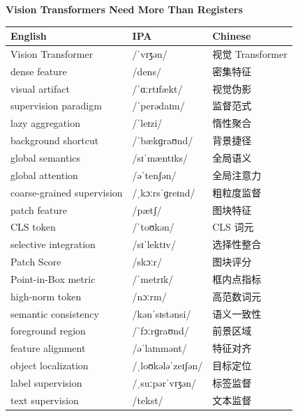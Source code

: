 \documentclass[UTF8,12pt,a4paper]{ctexart}
\providecommand{\zh}[1]{#1}
\begin{document}
\newpage

\begin{center}
    {\Large\bfseries Vision Transformers Need More Than Registers}
\end{center}

\begin{tabular*}{\textwidth}{@{\extracolsep{\fill}}lll@{}}
\toprule
\textbf{English} & \textbf{IPA} & \textbf{Chinese} \\
\midrule
Vision Transformer & {\ipafont /ˈvɪʒən/} & \zh{视觉 Transformer} \\
dense feature & {\ipafont /dens/} & \zh{密集特征} \\
visual artifact & {\ipafont /ˈɑːrtɪfækt/} & \zh{视觉伪影} \\
supervision paradigm & {\ipafont /ˈperədaɪm/} & \zh{监督范式} \\
lazy aggregation & {\ipafont /ˈleɪzi/} & \zh{惰性聚合} \\
background shortcut & {\ipafont /ˈbækɡraʊnd/} & \zh{背景捷径} \\
global semantics & {\ipafont /sɪˈmæntɪks/} & \zh{全局语义} \\
global attention & {\ipafont /əˈtenʃən/} & \zh{全局注意力} \\
coarse-grained supervision & {\ipafont /ˌkɔːrsˈɡreɪnd/} & \zh{粗粒度监督} \\
patch feature & {\ipafont /pætʃ/} & \zh{图块特征} \\
CLS token & {\ipafont /ˈtoʊkən/} & \zh{CLS 词元} \\
selective integration & {\ipafont /sɪˈlektɪv/} & \zh{选择性整合} \\
Patch Score & {\ipafont /skɔːr/} & \zh{图块评分} \\
Point-in-Box metric & {\ipafont /ˈmetrɪk/} & \zh{框内点指标} \\
high-norm token & {\ipafont /nɔːrm/} & \zh{高范数词元} \\
semantic consistency & {\ipafont /kənˈsɪstənsi/} & \zh{语义一致性} \\
foreground region & {\ipafont /ˈfɔːrɡraʊnd/} & \zh{前景区域} \\
feature alignment & {\ipafont /əˈlaɪnmənt/} & \zh{特征对齐} \\
object localization & {\ipafont /ˌloʊkələˈzeɪʃən/} & \zh{目标定位} \\
label supervision & {\ipafont /ˌsuːpərˈvɪʒən/} & \zh{标签监督} \\
text supervision & {\ipafont /tekst/} & \zh{文本监督} \\

\end{tabular*}
\end{document}
